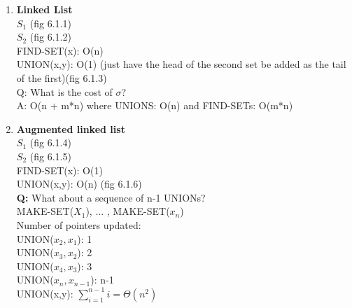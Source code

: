 \documentclass{article}
\begin{document}
	\begin{enumerate}
		\item \textbf{Linked List}\\
		$S_1$ (fig 6.1.1)\\
		$S_2$ (fig 6.1.2)\\
		FIND-SET(x): O(n)\\
		UNION(x,y): O(1) (just have the head of the second set be added as the tail of the first)(fig 6.1.3)\\
		Q: What is the cost of $\sigma$?\\
		A: O(n + m*n) where UNIONS: O(n) and FIND-SETs: O(m*n)\\
		\item \textbf{Augmented linked list}\\
		$S_1$ (fig 6.1.4)\\
		$S_2$ (fig 6.1.5)\\
		FIND-SET(x): O(1)\\
		UNION(x,y): O(n) (fig 6.1.6)\\
		\textbf{Q:} What about a sequence of n-1 UNIONs?\\
		MAKE-SET($X_1$), ... , MAKE-SET($x_n$)\\ 
		Number of pointers updated:\\
		UNION($x_2,x_1$): 1\\
		UNION($x_3,x_2$): 2\\
		UNION($x_4,x_3$): 3\\
		UNION($x_n,x_{n-1}$): n-1\\
		UNION(x,y): $\sum_{i=1}^{n-1}i=\Theta(n^2)$\\
		

\end{enumerate}
\end{document}
